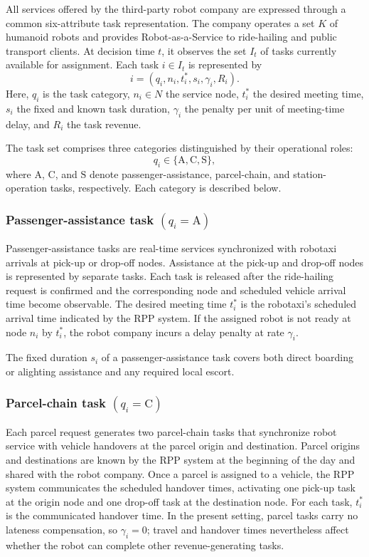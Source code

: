 \documentclass[11pt,oneside]{article}
\begin{document}
All services offered by the third-party robot company are expressed through a
common six-attribute task representation. The company operates a set \(K\) of
humanoid robots and provides Robot-as-a-Service to ride-hailing and public
transport clients. At decision time \(t\), it observes the set \(I_t\) of tasks
currently available for assignment. Each task \(i\in I_t\) is represented by
\[
i=
\left(
q_i,n_i,t_i^*,s_i,\gamma_i,R_i
\right).
\]
Here, \(q_i\) is the task category, \(n_i\in N\) the service node,
\(t_i^*\) the desired meeting time, \(s_i\) the fixed and known task duration,
\(\gamma_i\) the penalty per unit of meeting-time delay, and \(R_i\) the task
revenue.

The task set comprises three categories distinguished by their operational
roles:
\[
q_i\in\{\mathrm{A},\mathrm{C},\mathrm{S}\},
\]
where \(\mathrm{A}\), \(\mathrm{C}\), and \(\mathrm{S}\) denote
passenger-assistance, parcel-chain, and station-operation tasks, respectively.
Each category is described below.

\subsubsection{Passenger-assistance task \((q_i=\mathrm{A})\)}
Passenger-assistance tasks are real-time services synchronized with robotaxi
arrivals at pick-up or drop-off nodes. Assistance at the pick-up and drop-off
nodes is represented by separate tasks. Each task is released after the
ride-hailing request is confirmed and the corresponding node and scheduled
vehicle arrival time become observable. The desired meeting time \(t_i^*\) is
the robotaxi's scheduled arrival time indicated by the RPP system. If the
assigned robot is not ready at node \(n_i\) by \(t_i^*\), the robot company
incurs a delay penalty at rate \(\gamma_i\).

The fixed duration \(s_i\) of a passenger-assistance task covers both direct
boarding or alighting assistance and any required local escort.


\subsubsection{Parcel-chain task
\((q_i=\mathrm{C})\)}
Each parcel request generates two parcel-chain tasks that synchronize robot
service with vehicle handovers at the parcel origin and destination. Parcel
origins and destinations are known by the RPP system at the beginning of the
day and shared with the robot company. Once a parcel is assigned to a vehicle,
the RPP system communicates the scheduled handover times, activating one
pick-up task at the origin node and one drop-off task at the destination node.
For each task, \(t_i^*\) is the communicated handover time. In the present
setting, parcel tasks carry no lateness compensation, so \(\gamma_i=0\);
travel and handover times nevertheless affect whether the robot can complete
other revenue-generating tasks.
\end{document}
